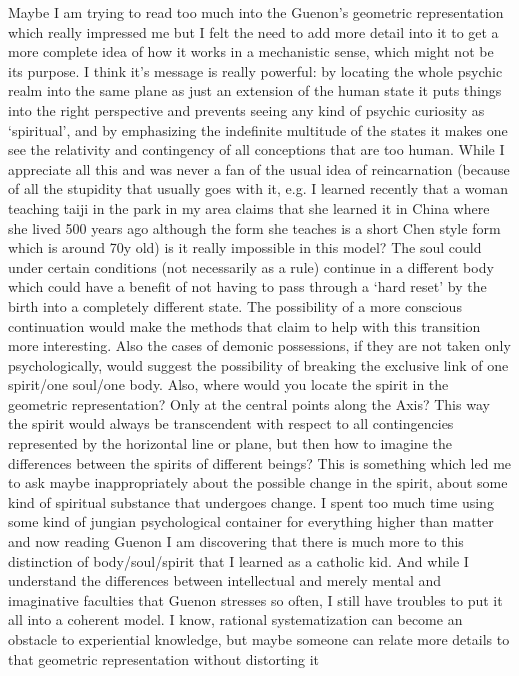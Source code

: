 \begin{footnotesize}
\begin{sffamily}
Maybe I am trying to read too much into the Guenon's geometric representation which really impressed me but I felt the need to add more detail into it to get a more complete idea of how it works in a mechanistic sense, which might not be its purpose. I think it's message is really powerful: by locating the whole psychic realm into the same plane as just an extension of the human state it puts things into the right perspective and prevents seeing any kind of psychic curiosity as `spiritual', and by emphasizing the indefinite multitude of the states it makes one see the relativity and contingency of all conceptions that are too human. While I appreciate all this and was never a fan of the usual idea of reincarnation (because of all the stupidity that usually goes with it, e.g. I learned recently that a woman teaching taiji in the park in my area claims that she learned it in China where she lived 500 years ago although the form she teaches is a short Chen style form which is around 70y old) is it really impossible in this model? The soul could under certain conditions (not necessarily as a rule) continue in a different body which could have a benefit of not having to pass through a `hard reset' by the birth into a completely different state. The possibility of a more conscious continuation would make the methods that claim to help with this transition more interesting. Also the cases of demonic possessions, if they are not taken only psychologically, would suggest the possibility of breaking the exclusive link of one spirit/one soul/one body. Also, where would you locate the spirit in the geometric representation? Only at the central points along the Axis? This way the spirit would always be transcendent with respect to all contingencies represented by the horizontal line or plane, but then how to imagine the differences between the spirits of different beings? This is something which led me to ask maybe inappropriately about the possible change in the spirit, about some kind of spiritual substance that undergoes change. I spent too much time using some kind of jungian psychological container for everything higher than matter and now reading Guenon I am discovering that there is much more to this distinction of body/soul/spirit that I learned as a catholic kid. And while I understand the differences between intellectual and merely mental and imaginative faculties that Guenon stresses so often, I still have troubles to put it all into a coherent model. I know, rational systematization can become an obstacle to experiential knowledge, but maybe someone can relate more details to that geometric representation without distorting it


\end{sffamily}
\end{footnotesize}
